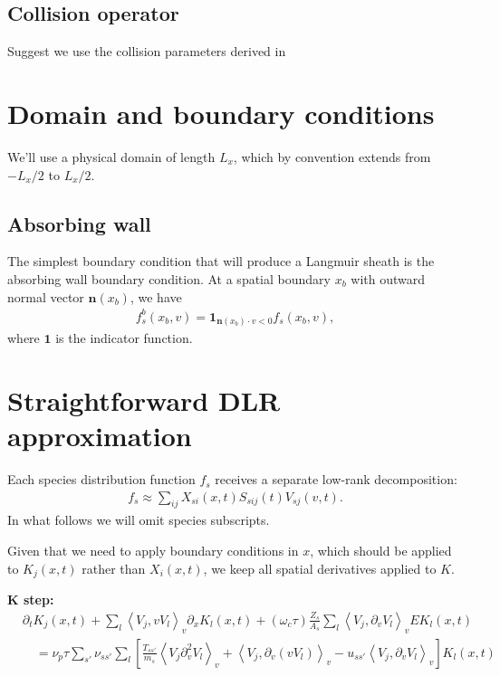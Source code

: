 \documentclass{article}
\newcommand{\jack}[1]{{\color{ForestGreen} #1}}
\begin{document}
\subsection{Collision operator}

\jack{Suggest we use the collision parameters derived in \cite{habbershawNonlinearConservativeEntropic2024}}


\section{Domain and boundary conditions}

We'll use a physical domain of length $L_x$, which by convention extends from $-L_x/2$ to $L_x/2$.

\subsection{Absorbing wall}
The simplest boundary condition that will produce a Langmuir sheath is the absorbing wall
boundary condition. At a spatial boundary $x_b$ with outward normal vector $\mathbf{n}(x_b)$, we have
\begin{align}
    f_s^b(x_b, v) = \mathbf{1}_{\mathbf{n}(x_b) \cdot v < 0} f_s(x_b, v),
\end{align}
where $\mathbf{1}$ is the indicator function.


\section{Straightforward DLR approximation}

Each species distribution function $f_s$ receives a separate low-rank decomposition:
\begin{align}
    f_s \approx \sum_{ij} X_{si}(x, t) S_{sij}(t) V_{sj}(v, t).
\end{align}
In what follows we will omit species subscripts.

Given that we need to apply boundary conditions in $x$, which should be applied to $K_j(x, t)$ rather
than $X_i(x, t)$, we keep all spatial derivatives applied to $K$.

\textbf{K step:}
\begin{align*}
    &\partial_t K_j(x, t) + \sum_l \left\langle V_j, v V_l \right\rangle_v \partial_x K_l(x, t) + (\omega_c \tau) \frac{Z_s}{A_s} \sum_l \left\langle V_j, \partial_v V_l \right\rangle_v E K_l(x, t) \\
    &\quad = \nu_p \tau \sum_{s'} \nu_{ss'} \sum_l \left[ \frac{T_{s s'}}{m_s} \left\langle V_j \partial_v^2 V_l \right\rangle_v + \left\langle V_j, \partial_v (v V_l) \right\rangle_v - u_{ss'} \left\langle V_j, \partial_v V_l \right\rangle_v \right] K_l(x, t)
\end{align*}
\end{document}
